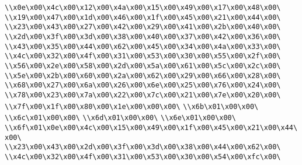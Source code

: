 \verb|\\x0e\x00\x4c\x00\x12\x00\x4a\x00\x15\x00\x49\x00\x17\x00\x48\x00\|\newline
\verb|\\x19\x00\x47\x00\x1d\x00\x46\x00\x1f\x00\x45\x00\x21\x00\x44\x00\|\newline
\verb|\\x23\x00\x43\x00\x27\x00\x42\x00\x29\x00\x41\x00\x2b\x00\x40\x00\|\newline
\verb|\\x2d\x00\x3f\x00\x3d\x00\x38\x00\x40\x00\x37\x00\x42\x00\x36\x00\|\newline
\verb|\\x43\x00\x35\x00\x44\x00\x62\x00\x45\x00\x34\x00\x4a\x00\x33\x00\|\newline
\verb|\\x4c\x00\x32\x00\x4f\x00\x31\x00\x53\x00\x30\x00\x55\x00\x2f\x00\|\newline
\verb|\\x56\x00\x2e\x00\x58\x00\x2d\x00\x5a\x00\x61\x00\x5c\x00\x2c\x00\|\newline
\verb|\\x5e\x00\x2b\x00\x60\x00\x2a\x00\x62\x00\x29\x00\x66\x00\x28\x00\|\newline
\verb|\\x68\x00\x27\x00\x6a\x00\x26\x00\x6e\x00\x25\x00\x76\x00\x24\x00\|\newline
\verb|\\x78\x00\x23\x00\x7a\x00\x22\x00\x7c\x00\x21\x00\x7e\x00\x20\x00\|\newline
\verb|\\x7f\x00\x1f\x00\x80\x00\x1e\x00\x00\x00\|\newline
\verb|\\x6b\x01\x00\x00\|\newline
\verb|\\x6c\x01\x00\x00\|\newline
\verb|\\x6d\x01\x00\x00\|\newline
\verb|\\x6e\x01\x00\x00\|\newline
\verb|\\x6f\x01\x0e\x00\x4c\x00\x15\x00\x49\x00\x1f\x00\x45\x00\x21\x00\x44\x00\|\newline
\verb|\\x23\x00\x43\x00\x2d\x00\x3f\x00\x3d\x00\x38\x00\x44\x00\x62\x00\|\newline
\verb|\\x4c\x00\x32\x00\x4f\x00\x31\x00\x53\x00\x30\x00\x54\x00\xfc\x00\|\newline
